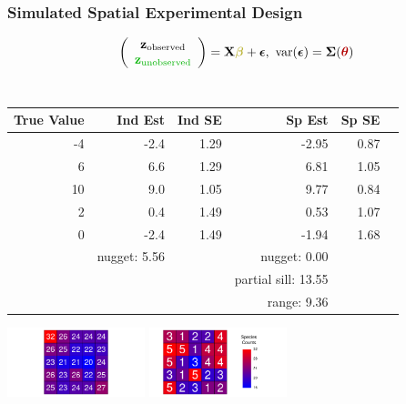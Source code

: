 \documentclass[mathserif,compress]{beamer}\usepackage{graphicx, color}
\def\bz{\mathbf{z}}
\def\bX{\mathbf{X}}
\def\bbeta{\mbox{\boldmath $\beta$}}
\def\bepsilon{\mbox{\boldmath $\epsilon$}}
\def\btheta{\mbox{\boldmath $\theta$}}
\def\bSigma{\mbox{\boldmath $\Sigma$}}
\def\var{\textrm{var}}
\newcommand{\cye}[1]{\color{yellow!70!black}#1}
\newcommand{\cre}[1]{\color{red!70!black}#1}
\begin{document}

\begin{frame} 
\frametitle{Simulated Spatial Experimental Design}



	




\scriptsize

		 \[
			\left(\begin{array}{c}	
					\bz_{\textrm{observed}} \\
					{\color{green!70!black} \bz_{\textrm{unobserved}}}
			\end{array} \right) =  \bX{\color{yellow!70!black}\bbeta} + 
			\bepsilon, \ \var(\bepsilon) = \bSigma({\color{red!70!black}\btheta}) \] \\

\begin{table}[ht]
\centering
\begin{tabular}{rrrrrr}
True Value & Ind Est & Ind SE & Sp Est & Sp SE \\ 
  \hline
-4 & \cye{-2.4} & \cye{1.29} & \cye{-2.95} & \cye{0.87} \\ 
6 & \cye{6.6} & \cye{1.29} & \cye{6.81} & \cye{1.05} \\ 
10 & \cye{9.0} & \cye{1.05} & \cye{9.77} & \cye{0.84} \\ 
2 & \cye{0.4} & \cye{1.49} & \cye{0.53} & \cye{1.07} \\ 
0 & \cye{-2.4} & \cye{1.49} & \cye{-1.94} & \cye{1.68} \\ 
   \hline
& nugget: \cre{5.56} & & nugget: \cre{0.00} & \\
& & & partial sill: \cre{13.55} & \\
& & & range:  \cre{9.36} & \\
\end{tabular}
\end{table}

		\vspace{-.5cm}
		\begin{center}
			\includegraphics[width=4cm]{figure/fireDivOrig-plot} 
			\includegraphics[width=4cm]{figure/fireDiv-plot} 
		\end{center} 

\end{frame}
\end{document}
